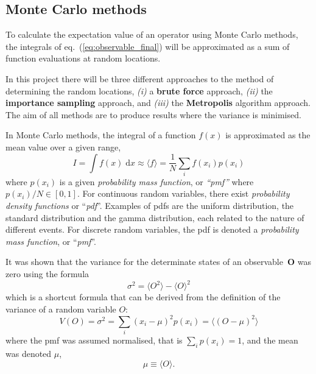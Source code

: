 \documentclass[a4paper,11pt]{article}
\newcommand{\diff}{\ensuremath{\; \text{d}}}
\begin{document}
\subsection{Monte Carlo methods}
To calculate the expectation value of an operator using Monte Carlo methods, the integrals of eq.~(\ref{eq:observable_final}) will be approximated as a sum of function evaluations at random locations.

In this project there will be three different approaches to the method of determining the random locations, \textit{(i)} a \textbf{brute force} approach, \textit{(ii)} the \textbf{importance sampling} approach, and \textit{(iii)} the \textbf{Metropolis} algorithm approach. The aim of all methods are to produce results where the variance is minimised.

In Monte Carlo methods, the integral of a function $f(x)$ is approximated as the mean value over a given range, 
\begin{equation}
    I = \int f(x) \diff x \approx \langle f \rangle = \frac{1}{N} \sum_i f(x_i) p(x_i)
    \label{eq:integraldef}
\end{equation}
where $p(x_i)$ is a given \textit{probability mass function}, or \textit{``pmf''} where $p(x_i)/N \in [0,1]$. For continuous random variables, there exist \textit{probability density functions} or ``\textit{pdf}''. Examples of pdfs are the uniform distribution, the standard distribution and the gamma distribution, each related to the nature of different events. For discrete random variables, the pdf is denoted a \textit{probability mass function}, or ``\textit{pmf}''.

It was shown that the variance for the determinate states of an observable~$\mathbf{O}$ was zero using the formula
\begin{equation}
    \sigma^2 = \langle O^2 \rangle - \langle O \rangle^2
    \label{eq:shortcut}
\end{equation}
which is a shortcut formula that can be derived from the definition \cite{Devore:2007} of the variance of a random variable $O$:
\begin{equation}
    V(O) = \sigma^2 = \sum_i \left( x_i-\mu \right)^2 p(x_i) = \langle \left( O - \mu \right)^2 \rangle
    \label{eq:variancedef}
\end{equation}
where the pmf was assumed normalised, that is $\sum_i p(x_i) = 1$, and the mean was denoted $\mu$,
\begin{equation}
    \mu \equiv \langle O \rangle.
    \label{eq:mean}
\end{equation}
\end{document}

